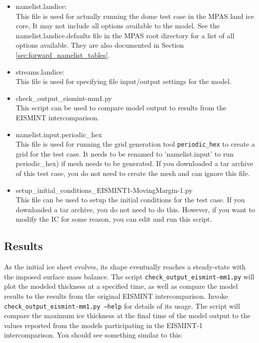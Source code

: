 \begin{itemize}
\item namelist.landice: \\
	This file is used for actually running the dome test case in the MPAS land ice core.  It may not include all options available to the model.  See the namelist.landice.defaults file in the MPAS root directory for a list of all options available.  They are also documented in Section \ref{sec:forward_namelist_tables}.

\item streams.landice: \\
	This file is used for specifying file input/output settings for the model.

\item check\_output\_eismint-mm1.py \\
This script can be used to compare model output to results from the EISMINT intercomparison.

\item namelist.input.periodic\_hex \\
 This file is used for running the grid generation tool \texttt{periodic\_hex} to create a grid for the test case.  It needs to be renamed to 'namelist.input' to run periodic\_hex) if mesh needs to be generated.  If you downloaded a tar archive of this test case, you do not need to create the mesh and can ignore this file.

\item setup\_initial\_conditions\_EISMINT1-MovingMargin-1.py \\
This file can be used to setup the initial conditions for the test case.  If you downloaded a tar archive, you do not need to do this.  However, if you want to modify the IC for some reason, you can edit and run this script.

\end{itemize}

\subsection{Results}
\label{subsecc:eismint_results}
As the initial ice sheet evolves, its shape eventually reaches a steady-state with the imposed surface mass balance.  
The script \texttt{check\_output\_eismint-mm1.py} will plot the modeled thickness at a specified time, 
as well as compare the model results to the results from the original EISMINT intercomparison.  
Invoke \texttt{check\_output\_eismint-mm1.py --help} for details of its usage.  
The script will compare the maximum ice thickness at the final time of the model output 
to the values reported from the models participating in the EISMINT-1 intercomparison.  
You should see something similar to this:


